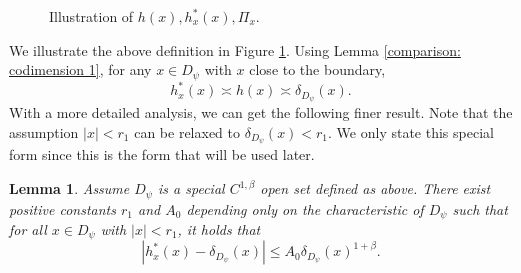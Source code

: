 \documentclass[12pt,a4paper]{amsart}
\numberwithin{equation}{section}
\theoremstyle{plain}
\newcommand{\be}{\beta}
\newcommand{\wt}{\widetilde}
\newcommand{\1}{\mathbbm{1}}
\newtheorem{lemma}[theorem]{Lemma}
\begin{document}
\begin{center}
\begin{figure}[H]
\caption{Illustration of $h(x),h_x^*(x), \Pi_x$.}
\label{figure1}
\end{figure}
\end{center}
We illustrate the above definition in Figure \ref{figure1}. Using Lemma \ref{comparison: codimension 1}, for any $x\in D_{\psi}$ with $x$ close to the boundary, 
\begin{equation}\label{equivalence of three distances}
    h_x^*(x) \asymp h(x) \asymp \delta_{D_{\psi}}(x).
\end{equation}
With a more detailed analysis, we can get the following finer result. Note that the assumption $|x|<r_1$ can be relaxed to $\delta_{D_{\psi}}(x) < r_1$.  We only state this special form since this is the form that will be used later.
\begin{lemma} \label{key lemma: distance comparison}
Assume $D_{\psi}$ is a special $C^{1,\beta}$ open set defined as above. There exist positive constants $r_1$ and $A_0$ depending only on the characteristic of $D_\psi$ such that for all $x \in D_{\psi}$ with $|x|<r_1$, it holds that
\begin{equation}
|h_x^*(x) - \delta_{D_{\psi}}(x)| \le A_0 \delta_{D_{\psi}}(x)^{1+\be}.
\end{equation}
\end{lemma}
\end{document}
